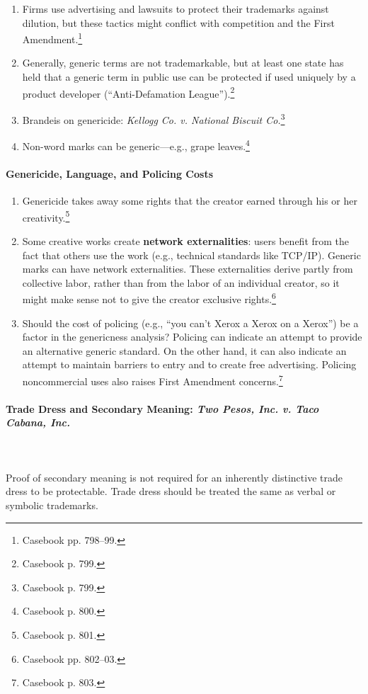 \begin{enumerate}
    \item Firms use advertising and lawsuits to protect their trademarks 
    against dilution, but these tactics might conflict with competition and 
    the First Amendment.\footnote{Casebook pp. 798--99.}
    \item Generally, generic terms are not trademarkable, but at least one 
    state has held that a generic term in public use can be protected if used 
    uniquely by a product developer (``Anti-Defamation 
    League'').\footnote{Casebook p. 799.}
    \item Brandeis on genericide: \emph{Kellogg Co. v. National Biscuit 
    Co.}\footnote{Casebook p. 799.}
    \item Non-word marks can be generic---e.g., grape 
    leaves.\footnote{Casebook p. 800.}
\end{enumerate}

\paragraph{Genericide, Language, and Policing Costs}

\begin{enumerate}
    \item Genericide takes away some rights that the creator earned through 
    his or her creativity.\footnote{Casebook p. 801.}
    \item Some creative works create \textbf{network externalities}: users 
    benefit from the fact that others use the work (e.g., technical standards 
    like TCP/IP). Generic marks can have network externalities. These 
    externalities derive partly from collective labor, rather than from the 
    labor of an individual creator, so it might make sense not to give the 
    creator exclusive rights.\footnote{Casebook pp. 802--03.}
    \item Should the cost of policing (e.g., ``you can't Xerox a Xerox on a 
    Xerox'') be a factor in the genericness analysis? Policing can indicate an 
    attempt to provide an alternative generic standard. On the other hand, it 
    can also indicate an attempt to maintain barriers to entry and to create 
    free advertising. Policing noncommercial uses also raises First Amendment 
    concerns.\footnote{Casebook p. 803.}
\end{enumerate}

\paragraph{Trade Dress and Secondary Meaning: \emph{Two Pesos, Inc. v. Taco 
Cabana, Inc.}}
~\\\\
Proof of secondary meaning is not required for an inherently distinctive trade 
dress to be protectable. Trade dress should be treated the same as verbal or 
symbolic trademarks.

